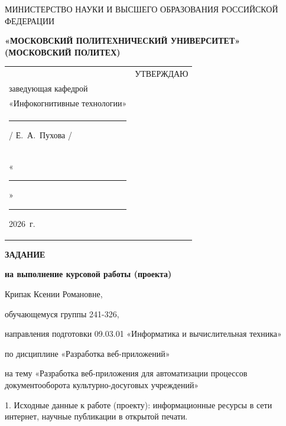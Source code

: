 \documentclass[14pt, a4paper]{extarticle}
\begin{document}
\pagestyle{empty}


\begin{center}
    {\small МИНИСТЕРСТВО НАУКИ И ВЫСШЕГО ОБРАЗОВАНИЯ РОССИЙСКОЙ ФЕДЕРАЦИИ}


    {\small \textbf{«МОСКОВСКИЙ ПОЛИТЕХНИЧЕСКИЙ УНИВЕРСИТЕТ»}} \\
    {\small \textbf{(МОСКОВСКИЙ ПОЛИТЕХ)}}
\end{center}

\begin{tabularx}{\textwidth}{@{} p{} p{} @{}}
     &
    \raggedright
    УТВЕРЖДАЮ                          \\
    заведующая кафедрой                \\
    «Инфокогнитивные технологии»       \\[0.3cm]

    \rule{3cm}{0.4pt} / Е.~А.~Пухова / \\[0.1cm]

    «\rule{0.8cm}{0.4pt}» \rule{3cm}{0.4pt} 2026~г.
\end{tabularx}


\begin{center}

    { \large \textbf{ЗАДАНИЕ}}

    \textbf{на выполнение курсовой работы (проекта)}

    Крипак Ксении Романовне, %

\end{center}

обучающемуся группы 241-326,

направления подготовки 09.03.01 «Информатика и вычислительная техника»

по дисциплине «Разработка веб-приложений»

на тему «Разработка веб-приложения для автоматизации процессов документооборота культурно-досуговых учреждений»

1. Исходные данные к работе (проекту): информационные ресурсы в сети
интернет, научные публикации в открытой печати.
\end{document}
